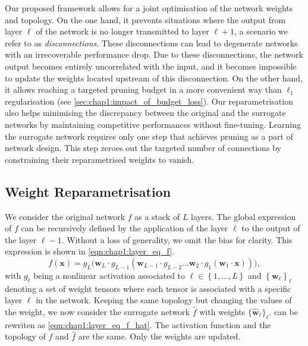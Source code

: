 Our proposed framework allows for a joint optimisation of the network weights
and topology. On the one hand, it prevents situations where the output from
layer $\ell$ of the network is no longer transmitted to layer $\ell+1$, a
scenario we refer to as \emph{disconnections}. These disconnections can lead to
degenerate networks with an irrecoverable performance drop. Due to these
disconnections, the network output becomes entirely uncorrelated with the input,
and it becomes impossible to update the weights located upstream of this
disconnection. On the other hand, it allows reaching a targeted pruning budget
in a more convenient way than $\ell_1$ regularisation (see
\cref{sec:chap1:impact_of_budget_loss}). Our reparametrisation also helps
minimising the discrepancy between the original and the surrogate networks by
maintaining competitive performances without fine-tuning. Learning the surrogate
network requires only one step that achieves pruning as a part of network
design. This step zeroes out the targeted number of connections by constraining
their reparametrised weights to vanish.


\subsection{Weight Reparametrisation}
\label{sec:chap1:weight_reparam}

We consider the original network $f$ as a stack of $L$ layers. The global
expression of $f$ can be recursively defined by the application of the layer
$\ell$ to the output of the layer $\ell-1$. Without a loss of generality, we
omit the bias for clarity. This expression is shown in
\cref{eqn:chap1:layer_eq_f}.
\begin{equation}
\label{eqn:chap1:layer_eq_f}
f(\mathbf{x}) = g_L \big(\mathbf{w}_L \cdot g_{L-1}(\mathbf{w}_{L-1} \cdot g_{L-2} \dots
\mathbf{w}_2 \cdot g_1(\mathbf{w}_1 \cdot \mathbf{x}))\big),
\end{equation}
\noindent with $g_\ell$ being a nonlinear activation associated to $\ell \in
\left\{ 1,\dots, L \right\}$ and $\left\{ \mathbf{w}_\ell \right\}_\ell$
denoting a set of weight tensors where each tensor is associated with a specific
layer $\ell$ in the network. Keeping the same topology but changing the values
of the weight, we now consider the surrogate network $\hat{f}$ with weights
$\{\mathbf{\hat{w}}_\ell\}_\ell$.  can be rewriten as
\cref{eqn:chap1:layer_eq_f_hat}. The activation function and the topology of $f$
and $\hat{f}$ are the same. Only the weights are updated.

